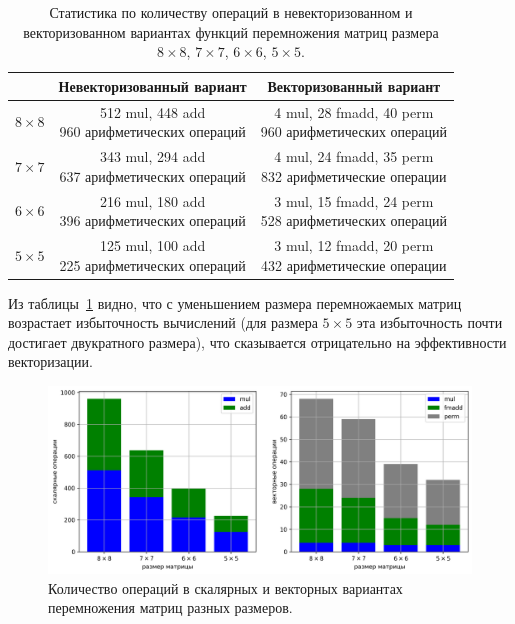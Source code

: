 \begin{table}
\centering
\singlespacing
{}\caption{Статистика по количеству операций в невекторизованном и векторизованном вариантах функций перемножения матриц размера $8 \times 8$, $7 \times 7$, $6 \times 6$, $5 \times 5$.}
\bigskip
\label{tbl:text_4_spec_matr_tabl}
\begin{tabular}{ | c | c | c | }
  \hline
  \ & Невекторизованный вариант & Векторизованный вариант \\ \hline\hline
  $8 \times 8$ & \makecell{512 mul, 448 add \\ 960 арифметических операций} & \makecell{4 mul, 28 fmadd, 40 perm \\ 960 арифметических операций} \\ \hline
  $7 \times 7$ & \makecell{343 mul, 294 add \\ 637 арифметических операций} & \makecell{4 mul, 24 fmadd, 35 perm \\ 832 арифметические операции} \\ \hline
  $6 \times 6$ & \makecell{216 mul, 180 add \\ 396 арифметических операций} & \makecell{3 mul, 15 fmadd, 24 perm \\ 528 арифметических операций} \\ \hline
  $5 \times 5$ & \makecell{125 mul, 100 add \\ 225 арифметических операций} & \makecell{3 mul, 12 fmadd, 20 perm \\ 432 арифметические операции}
 \\ \hline
\end{tabular}
\end{table}

Из таблицы~\ref{tbl:text_4_spec_matr_tabl} видно, что с уменьшением размера перемножаемых матриц возрастает избыточность вычислений (для размера $5 \times 5$ эта избыточность почти достигает двукратного размера), что сказывается отрицательно на эффективности векторизации.

\begin{figure}[ht]
\centering
\includegraphics[width=1.00\textwidth]{./fig/vec_spec_matrices_stat.png}
\singlespacing
{}\caption{Количество операций в скалярных и векторных вариантах перемножения матриц разных размеров.}
\label{fig:text_4_spec_matr_stat}
\end{figure}

